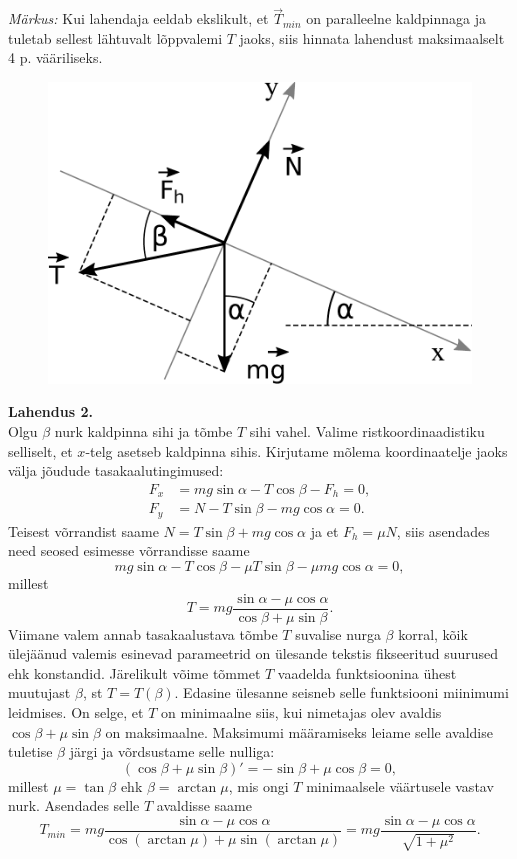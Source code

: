 \documentclass[10pt]{article}
\begin{document}
\emph{Märkus:} Kui lahendaja eeldab ekslikult, et $\overrightarrow{T}_{min}$ on paralleelne kaldpinnaga ja tuletab sellest lähtuvalt lõppvalemi $T$ jaoks, siis hinnata lahendust
maksimaalselt 4 p. vääriliseks.

\begin{figure}
\vspace{-0.5cm}
  \begin{center}
    \includegraphics[width=0.8\linewidth]{2021-v2g-10-yl2.pdf}
  \end{center}
  \vspace{-0.5cm}
\end{figure}
\textbf{Lahendus 2.} \\
Olgu $\beta$ nurk kaldpinna sihi ja tõmbe $T$ sihi vahel. Valime ristkoordinaadistiku selliselt, et $x$-telg asetseb kaldpinna sihis. Kirjutame mõlema koordinaatelje jaoks välja jõudude tasakaalutingimused:
\begin{align*}
  F_x &= mg\sin{\alpha}-T\cos\beta-F_h=0,\\
  F_y &= N-T\sin\beta-mg\cos\alpha=0.
\end{align*}
Teisest võrrandist saame $N=T\sin\beta+mg\cos\alpha$
ja et $F_h =\mu N$, siis asendades need seosed esimesse võrrandisse saame
\[mg\sin\alpha-T\cos\beta-\mu T\sin\beta - \mu mg\cos\alpha=0,\]
millest
\[T=mg\frac{\sin\alpha-\mu\cos\alpha}{\cos\beta+\mu\sin\beta}.\]
Viimane valem annab tasakaalustava tõmbe $T$ suvalise nurga $\beta$ korral, kõik ülejäänud valemis esinevad parameetrid on ülesande tekstis fikseeritud suurused ehk konstandid.
Järelikult võime tõmmet $T$ vaadelda funktsioonina ühest muutujast $\beta$, st $T=T(\beta)$. Edasine ülesanne seisneb selle funktsiooni miinimumi leidmises. On selge, et $T$ on minimaalne siis,
kui nimetajas olev avaldis $\cos\beta+\mu\sin\beta$ on maksimaalne. Maksimumi määramiseks leiame selle avaldise tuletise $\beta$ järgi ja võrdsustame selle nulliga:
\[(\cos\beta+\mu\sin\beta)'=-\sin\beta+\mu\cos\beta=0, \]
millest $\mu=\tan\beta$ ehk $\beta=\arctan\mu$, mis ongi $T$ minimaalsele väärtusele vastav nurk. Asendades selle $T$ avaldisse saame
\[T_{min}=mg\frac{\sin\alpha-\mu\cos\alpha}{\cos(\arctan\mu)+\mu\sin(\arctan\mu)}= mg\frac{\sin\alpha-\mu\cos\alpha}{\sqrt{1+\mu^2}}.\]
\end{document}
